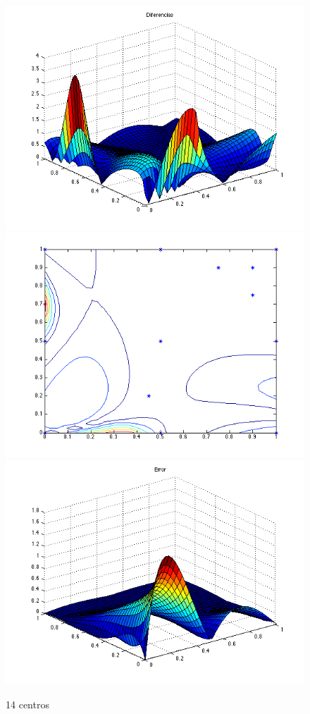 \documentclass[11pt,a4paper]{article}
\begin{document}
\begin{figure}[H]
\centering

\includegraphics[scale=0.35]{diferencias14.png}
\includegraphics[scale=0.4]{centros14.png}
\includegraphics[scale=0.4]{error14.png}
\caption{14 centros}
\end{figure}
\end{document}
